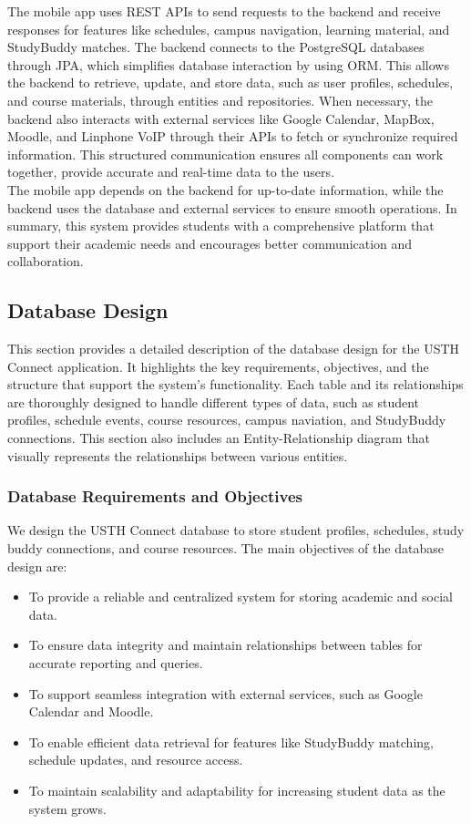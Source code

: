 \documentclass[12pt]{article}
\begin{document}
The mobile app uses REST APIs to send requests to the backend and receive responses for features like schedules, campus navigation, learning material, and StudyBuddy matches. 
The backend connects to the PostgreSQL databases through JPA, which simplifies database interaction by using ORM.
This allows the backend to retrieve, update, and store data, such as user profiles, schedules, and course materials, through entities and repositories.
When necessary, the backend also interacts with external services like Google Calendar, MapBox, Moodle, and Linphone VoIP through their APIs to fetch or synchronize required information.
This structured communication ensures all components can work together, provide accurate and real-time data to the users.\\

The mobile app depends on the backend for up-to-date information, while the backend uses the database and external services to ensure smooth operations.
In summary, this system provides students with a comprehensive platform that support their academic needs and encourages better communication and collaboration.

\pagebreak
\subsection{Database Design}
This section provides a detailed description of the database design for the USTH Connect application.
It highlights the key requirements, objectives, and the structure that support the system's functionality.
Each table and its relationships are thoroughly designed to handle different types of data, such as student profiles, schedule events, course resources, campus naviation, and StudyBuddy connections.
This section also includes an Entity-Relationship diagram that visually represents the relationships between various entities.

\subsubsection{Database Requirements and Objectives}  
We design the USTH Connect database to store student profiles, schedules, study buddy connections, and course resources. The main objectives of the database design are:  
\begin{itemize}  
    \item To provide a reliable and centralized system for storing academic and social data.  
    \item To ensure data integrity and maintain relationships between tables for accurate reporting and queries.  
    \item To support seamless integration with external services, such as Google Calendar and Moodle.  
    \item To enable efficient data retrieval for features like StudyBuddy matching, schedule updates, and resource access.  
    \item To maintain scalability and adaptability for increasing student data as the system grows.  
\end{itemize} 
\end{document}
